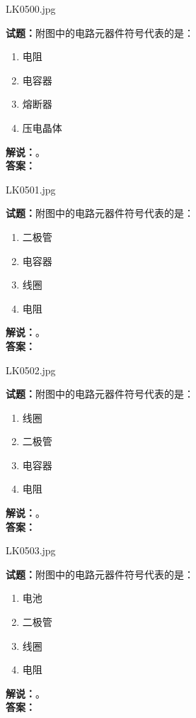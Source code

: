 \documentclass{ctexbook}
\begin{document}
\vspace{\baselineskip}

LK0500.jpg

\noindent\textbf{试题：}附图中的电路元器件符号代表的是：
\begin{enumerate}[leftmargin=3em]
  \item 电阻
  \item 电容器
  \item 熔断器
  \item 压电晶体
\end{enumerate}
\noindent\textbf{解说：}\textbf{}。\\\noindent\textbf{答案：}

\vspace{\baselineskip}

LK0501.jpg

\noindent\textbf{试题：}附图中的电路元器件符号代表的是：
\begin{enumerate}[leftmargin=3em]
  \item 二极管
  \item 电容器
  \item 线圈
  \item 电阻
\end{enumerate}
\noindent\textbf{解说：}\textbf{}。\\\noindent\textbf{答案：}

\vspace{\baselineskip}

LK0502.jpg

\noindent\textbf{试题：}附图中的电路元器件符号代表的是：
\begin{enumerate}[leftmargin=3em]
  \item 线圈
  \item 二极管
  \item 电容器
  \item 电阻
\end{enumerate}
\noindent\textbf{解说：}\textbf{}。\\\noindent\textbf{答案：}

\vspace{\baselineskip}

LK0503.jpg

\noindent\textbf{试题：}附图中的电路元器件符号代表的是：
\begin{enumerate}[leftmargin=3em]
  \item 电池
  \item 二极管
  \item 线圈
  \item 电阻
\end{enumerate}
\noindent\textbf{解说：}\textbf{}。\\\noindent\textbf{答案：}
\end{document}
